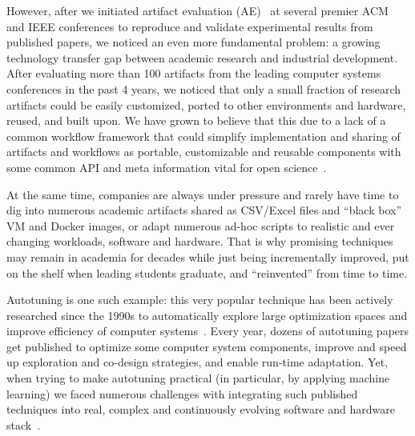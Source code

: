 However, after we initiated artifact evaluation (AE)~\cite{ctuning-ae1,childers2016artifact}
at several premier ACM and IEEE conferences to reproduce and validate experimental results 
from published papers, we noticed an even more
fundamental problem: a growing technology transfer gap between academic
research and industrial development.
%
After evaluating more than 100 artifacts from the leading computer systems conferences
in the past 4 years, we noticed that only a small fraction of research artifacts 
could be easily customized, ported to other environments and hardware, reused, 
and built upon.
%
We have grown to believe that this due to a lack of a common workflow framework
that could simplify implementation and sharing of artifacts and workflows as
portable, customizable and reusable components with some common API and meta information
vital for open science~\cite{new_pub_model}.

At the same time, companies are always under pressure and rarely have time to
dig into numerous academic artifacts shared as CSV/Excel files
and ``black box'' VM and Docker images, or adapt numerous ad-hoc scripts 
to realistic and ever changing workloads, software and hardware.
%
That is why promising techniques may remain in academia for decades while just
being incrementally improved, put on the shelf when leading students graduate,
and ``reinvented'' from time to time.

Autotuning is one such example: this very popular technique has been actively
researched since the 1990s to automatically explore large optimization spaces
and improve efficiency of computer systems~\cite{atlas, fftw, CSS99, VE00,
FOK02, Tapus:2002:AHT:762761.762771, vista, spiral, LCYP04, la2004, PE2006,
Shende:2006:TPP:1125980.1125982, 1742-6596-125-1-012089,
DBLP:conf/ipps/HartonoNS09, 29db2248aba45e59:a31e374796869125, tnld10,
openbenchmarking, Ren:2010:GPC:1849301.1849332, Grauer-Gray2012-hn,
DBLP:conf/cgo/GreweWO13, Khan:2013:SAC:2400682.2400690, ansel:pact:2014,
DBLP:conf/sc/TsaiLKD16, DBLP:conf/supercomputer/AbdelfattahHTD16}.
%
Every year, dozens of autotuning papers get published to optimize some computer
system components, improve and speed up exploration and co-design strategies,
and enable run-time adaptation.
%
Yet, when trying to make autotuning practical (in particular, by applying
machine learning) we faced numerous challenges with integrating such published
techniques into real, complex and continuously evolving software and hardware
stack~\cite{Fur2009,fursin:hal-01054763,cm:29db2248aba45e59:cd11e3a188574d80,new_pub_model}.

